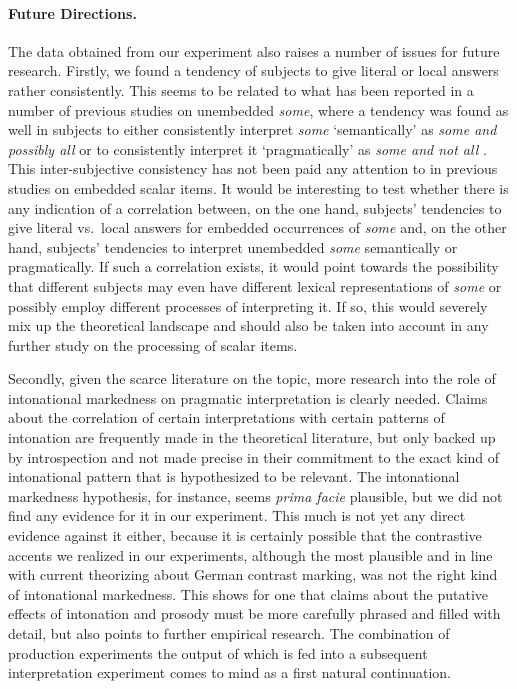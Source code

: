 \documentclass[fleqn,reqno,10pt,draft]{article}
\begin{document}
\paragraph{Future Directions.} The data obtained from our experiment
also raises a number of issues for future research. Firstly, we found
a tendency of subjects to give literal or local answers rather
consistently. This seems to be related to what has been reported in a
number of previous studies on unembedded \emph{some}, where a tendency
was found as well in subjects to either consistently interpret
\emph{some} `semantically' as \emph{some and possibly all} or to
consistently interpret it `pragmatically' as \emph{some and not all}
\citep[e.g.][]{NoveckPosada2003:Characterizing-,BottNoveck2004:Some-Utterances,DegenTanenhaus2012:Processing-Scal}. This
inter-subjective consistency has not been paid any attention to in
previous studies on embedded scalar items. It would be interesting to
test whether there is any indication of a correlation between, on the
one hand, subjects' tendencies to give literal vs.~local answers for
embedded occurrences of \emph{some} and, on the other hand, subjects'
tendencies to interpret unembedded \emph{some} semantically or
pragmatically. If such a correlation exists, it would point towards
the possibility that different subjects may even have different
lexical representations of \emph{some} or possibly employ different
processes of interpreting it. If so, this would severely mix up the
theoretical landscape and should also be taken into account in any
further study on the processing of scalar items.

Secondly, given the scarce literature on the topic, more research into
the role of intonational markedness on pragmatic interpretation is
clearly needed. Claims about the correlation of certain
interpretations with certain patterns of intonation are frequently
made in the theoretical literature, but only backed up by
introspection and not made precise in their commitment to the exact
kind of intonational pattern that is hypothesized to be relevant. The
intonational markedness hypothesis, for instance, seems \emph{prima
  facie} plausible, but we did not find any evidence for it in our
experiment. This much is not yet any direct evidence against it
either, because it is certainly possible that the contrastive accents
we realized in our experiments, although the most plausible and in
line with current theorizing about German contrast marking, was not
the right kind of intonational markedness. This shows for one that
claims about the putative effects of intonation and prosody must be
more carefully phrased and filled with detail, but also points to
further empirical research. The combination of production experiments
the output of which is fed into a subsequent interpretation experiment
comes to mind as a first natural continuation.
\end{document}
